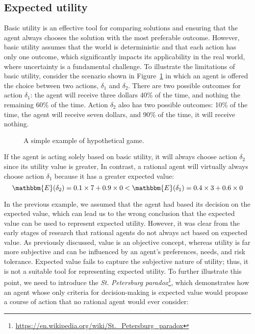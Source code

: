 \subsection{Expected utility}
Basic utility is an effective tool for comparing solutions and ensuring that the agent always chooses the solution with the most preferable outcome. However, basic utility assumes that the world is deterministic and that each action has only one outcome, which significantly impacts its applicability in the real world, where uncertainty is a fundamental challenge.
To illustrate the limitations of basic utility, consider the scenario shown in Figure~\ref{fig:expected_utility} in which an agent is offered the choice between two actions, $\delta_1$ and $\delta_2$. There are two possible outcomes for action $\delta_1$: the agent will receive three dollars 40\% of the time, and nothing the remaining 60\% of the time. Action $\delta_2$ also has two possible outcomes: 10\% of the time, the agent will receive seven dollars, and 90\% of the time, it will receive nothing.

\begin{figure}[H]
    \centering
        \caption{A simple example of hypothetical game.}
        \label{fig:expected_utility}
\end{figure}

If the agent is acting solely based on basic utility, it will always choose action $\delta_2$ since its utility value is greater, In contrast, a rational agent will virtually always choose action $\delta_1$ because it has a greater expected value:
$$ \mathbbm{E}(\delta_2) = 0.1 \times 7 + 0.9 \times 0  < \mathbbm{E}(\delta_1) = 0.4 \times 3 + 0.6 \times 0 $$

In the previous example, we assumed that the agent had based its decision on the expected value, which can lead us to the wrong conclusion that the expected value can be used to represent expected utility. However, it was clear from the early stages of research that rational agents do not always act based on expected value. As previously discussed, value is an objective concept, whereas utility is far more subjective and can be influenced by an agent's preferences, needs, and risk tolerance. Expected value fails to capture the subjective nature of utility; thus, it is not a suitable tool for representing expected utility. To further illustrate this point, we need to introduce the \textit{St. Petersburg paradox}\footnote{\url{https://en.wikipedia.org/wiki/St._Petersburg_paradox}}, which demonstrates how an agent whose only criteria for decision-making is expected value would propose a course of action that no rational agent would ever consider:

